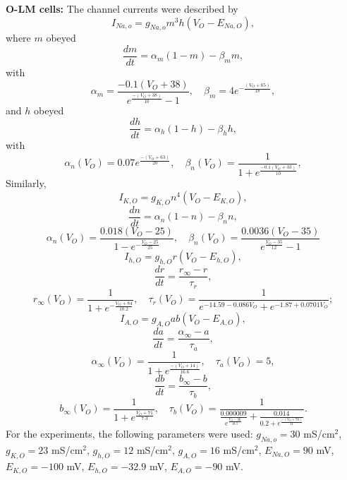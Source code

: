 \noindent
\textbf{O-LM cells:}
The channel currents were described by
\[
    I_{Na,o} = g_{Na,o}m^3h(V_O - E_{Na,O}),
\]
where \( m \) obeyed
\[
    \frac{dm}{dt} = \alpha_m(1 - m) - \beta_m m,
\]
with
\[
    \alpha_m = \frac{-0.1(V_O + 38)}{e^\frac{- (V_O+38)}{10} - 1}, \quad \beta_m = 4e^{-\frac{(V_O+65)}{18}},
\]
and \( h \) obeyed
\[
    \frac{dh}{dt} = \alpha_h(1 - h) - \beta_h h,
\]
with
\[
    \alpha_n(V_O) = 0.07e^{\frac{- (V_O + 63)}{20}}, \quad \beta_n(V_O) = \frac{1}{1 + e^\frac{-0.1(V_O+33)}{10}},
\]
Similarly,
\[
    I_{K,O} = g_{K, O}n^4(V_O - E_{K,O}),
\]
\[
    \frac{dn}{dt} = \alpha_n(1 - n) - \beta_n n,
\]
\[
    \alpha_n(V_O) = \frac{0.018(V_O - 25)}{1 - e^{-\frac{V_O - 25}{25}}}, \quad \beta_n(V_O) = \frac{0.0036(V_O - 35)}{e^{\frac{V_O - 35}{12}} - 1}
\]
\[
    I_{h,O} = g_{h,O}r(V_O - E_{h,O}),
\]
\[
    \frac{dr}{dt} = \frac{r_{\infty} - r}{\tau_r},
\]
\[
    r_{\infty}(V_O) = \frac{1}{1 + e^{-\frac{V_O + 84}{10.2}}}, \quad \tau_r(V_O) = \frac{1}{e^{-14.59 - 0.086V_O} + e^{-1.87 + 0.0701V_O}};
\]
\[
    I_{A,O} = g_{A,O}ab(V_O - E_{A,O}),
\]
\[
    \frac{da}{dt} = \frac{\alpha_{\infty} - a}{\tau_a},
\]
\[
    \alpha_{\infty}(V_O) = \frac{1}{1 + e^{\frac{- (V_O+14)}{16.6}}}, \quad \tau_a(V_O) = 5,
\]
\[
    \frac{db}{dt} = \frac{b_{\infty} - b}{\tau_b},
\]
\[
    b_{\infty}(V_O) = \frac{1}{1 + e^{\frac{V_O+71}{7.3}}}, \quad \tau_b(V_O) = \frac{1}{\frac{0.000009}{e^{\frac{V_O-26}{18.5}}} + \frac{0.014}{0.2+e^{\frac{- (V_O+70)}{11}}}}.
\]
For the experiments, the following parameters were used: \(g_{Na,o} = 30\)
mS/cm\(^2\), \(g_{K,O} = 23\) mS/cm\(^2\), \(g_{h,O} = 12\) mS/cm\(^2\),
\(g_{A,O} = 16\) mS/cm\(^2\), \(E_{Na,O} = 90\) mV, \(E_{K,O} = -100\) mV,
\(E_{h,O} = -32.9\) mV, \(E_{A,O} = - 90\) mV.\pagebreak

